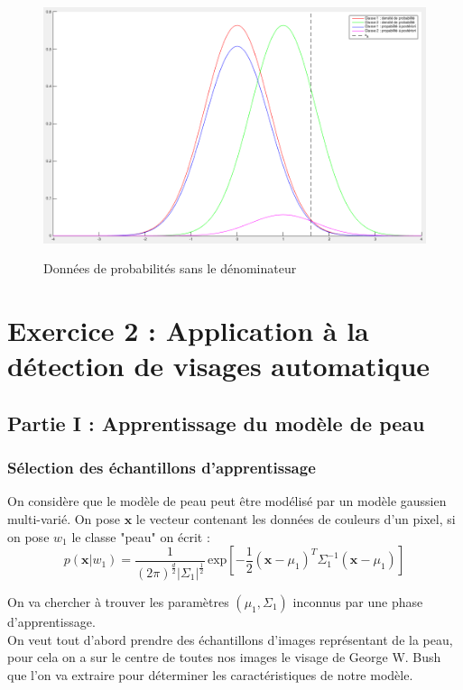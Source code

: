 \documentclass[11pt,a4paper]{article}
\begin{document}
\begin{figure}[H]
\center
\includegraphics[width=15cm]{exo1_graph_numerateur.png}
\label{fig.exo1_graph_numerateur}
\caption{Données de probabilités sans le dénominateur}
\end{figure}

\section{Exercice 2 : Application à la détection de visages automatique}


\subsection{Partie I : Apprentissage du modèle de peau}

\subsubsection{Sélection des échantillons d'apprentissage}

On considère que le modèle de peau peut être modélisé par un modèle gaussien multi-varié. On pose $\textbf{x}$ le vecteur contenant les données de couleurs d'un pixel, si on pose $w_1$ le classe "peau" on écrit :
\begin{equation}
p(\textbf{x}|w_1) = \frac{1}{(2\pi)^{\frac{d}{2}}|\Sigma_1|^{\frac{1}{2}}}\,\text{exp}\left[-\frac{1}{2}(\textbf{x}-\mu_1)^T \Sigma_1^{-1}(\textbf{x}-\mu_1)\right]
\end{equation}

On va chercher à trouver les paramètres $\left(\mu_1,\Sigma_1\right)$ inconnus par une phase d'apprentissage.
\\
On veut tout d'abord prendre des échantillons d'images représentant de la peau, pour cela on a sur le centre de toutes nos images le visage de George W. Bush que l'on va extraire pour déterminer les caractéristiques de notre modèle.
\end{document}
